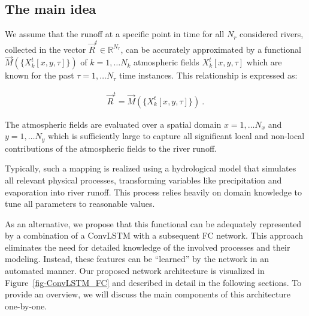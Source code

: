 \documentclass[
]{agujournal2019}
\begin{document}
\hypertarget{sec-main_idea}{%
\subsection{The main idea}\label{sec-main_idea}}

We assume that the runoff at a specific point in time for all \(N_r\)
considered rivers, collected in the vector
\(\vec{R}^t \in \mathbb{R}^{N_r}\), can be accurately approximated by a
functional \(\vec{M}(\{X^t_k[x,y,\tau]\})\) of \(k=1,\ldots N_k\)
atmospheric fields \(X^t_k[x,y,\tau]\) which are known for the past
\(\tau=1,\ldots N_\tau\) time instances. This relationship is expressed
as:

\[
\begin{aligned}
\vec{R}^t = \vec{M}(\{X^t_k[x,y,\tau]\}) \ .
\end{aligned}
\]

The atmospheric fields are evaluated over a spatial domain
\(x=1,\ldots N_x\) and \(y=1,\ldots N_y\) which is sufficiently large to
capture all significant local and non-local contributions of the
atmospheric fields to the river runoff.

Typically, such a mapping is realized using a hydrological model that
simulates all relevant physical processes, transforming variables like
precipitation and evaporation into river runoff. This process relies
heavily on domain knowledge to tune all parameters to reasonable values.

As an alternative, we propose that this functional can be adequately
represented by a combination of a ConvLSTM with a subsequent FC network.
This approach eliminates the need for detailed knowledge of the involved
processes and their modeling. Instead, these features can be ``learned''
by the network in an automated manner. Our proposed network architecture
is visualized in Figure~\ref{fig-ConvLSTM_FC} and described in detail in
the following sections. To provide an overview, we will discuss the main
components of this architecture one-by-one.
\end{document}
